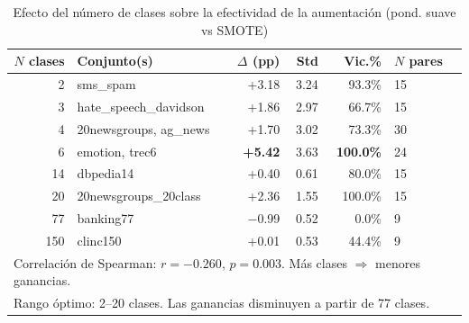 \begin{table}[htbp]
\centering
\caption{Efecto del número de clases sobre la efectividad de la aumentación (pond. suave vs SMOTE)}
\label{tab:nclasses_pattern}
\begin{tabular}{rlrrrll}
\toprule
\textbf{$N$ clases} & \textbf{Conjunto(s)} & \textbf{$\Delta$ (pp)} & \textbf{Std} & \textbf{Vic.\%} & \textbf{$N$ pares} \\
\midrule
2   & sms\_spam                      & +3.18 & 3.24 & 93.3\%  & 15 \\
3   & hate\_speech\_davidson          & +1.86 & 2.97 & 66.7\%  & 15 \\
4   & 20newsgroups, ag\_news          & +1.70 & 3.02 & 73.3\%  & 30 \\
\rowcolor{green!20}
6   & emotion, trec6                 & \textbf{+5.42} & 3.63 & \textbf{100.0\%} & 24 \\
14  & dbpedia14                      & +0.40 & 0.61 & 80.0\%  & 15 \\
20  & 20newsgroups\_20class           & +2.36 & 1.55 & 100.0\% & 15 \\
77  & banking77                      & $-$0.99 & 0.52 & 0.0\% & 9 \\
150 & clinc150                       & +0.01 & 0.53 & 44.4\%  & 9 \\
\midrule
\multicolumn{6}{l}{\small Correlación de Spearman: $r=-0.260$, $p=0.003$. Más clases $\Rightarrow$ menores ganancias.} \\
\multicolumn{6}{l}{\small Rango óptimo: 2--20 clases. Las ganancias disminuyen a partir de 77 clases.} \\
\bottomrule
\end{tabular}
\end{table}
